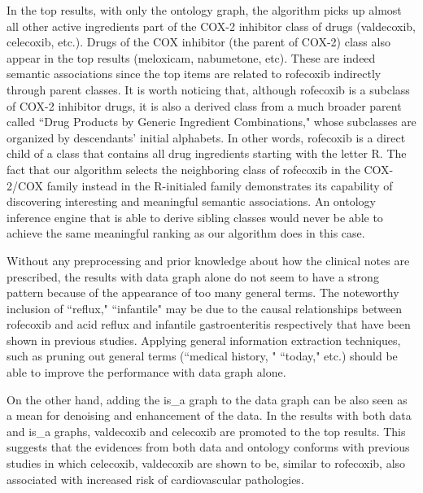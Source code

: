In the top results, with only the ontology graph, the algorithm picks up almost all other active ingredients part of the COX-2 inhibitor class of drugs (valdecoxib, celecoxib, etc.). Drugs of the COX inhibitor (the parent of COX-2) class also appear in the top results (meloxicam, nabumetone, etc). These are indeed semantic associations since the top items are related to rofecoxib indirectly through parent classes. It is worth noticing that, although rofecoxib is a subclass of COX-2 inhibitor drugs, it is also a derived class from a much broader parent called ``Drug Products by Generic Ingredient Combinations," whose subclasses are organized by descendants' initial alphabets. In other words, rofecoxib is a direct child of a class that contains all drug ingredients starting with the letter R. The fact that our algorithm selects the neighboring class of rofecoxib in the COX-2/COX family instead in the R-initialed family demonstrates its capability of discovering interesting and meaningful semantic associations. An ontology inference engine that is able to derive sibling classes would never be able to achieve the same meaningful ranking as our algorithm does in this case.

Without any preprocessing and prior knowledge about how the clinical notes are prescribed, the results with data graph alone do not seem to have a strong pattern because of the appearance of too many general terms. The noteworthy inclusion of ``reflux," ``infantile" may be due to the causal relationships between rofecoxib and acid reflux and infantile gastroenteritis respectively that have been shown in previous studies. Applying general information extraction techniques, such as pruning out general terms (``medical history, " ``today," etc.) should be able to improve the performance with data graph alone. 

On the other hand, adding the is\_a graph to the data graph can be also seen as a mean for denoising and enhancement of the data. In the results with both data and is\_a graphs, valdecoxib and celecoxib are promoted to the top results. This suggests that the evidences from both data and ontology conforms with previous studies in which celecoxib, valdecoxib are shown to be, similar to rofecoxib, also associated with increased risk of cardiovascular pathologies.

